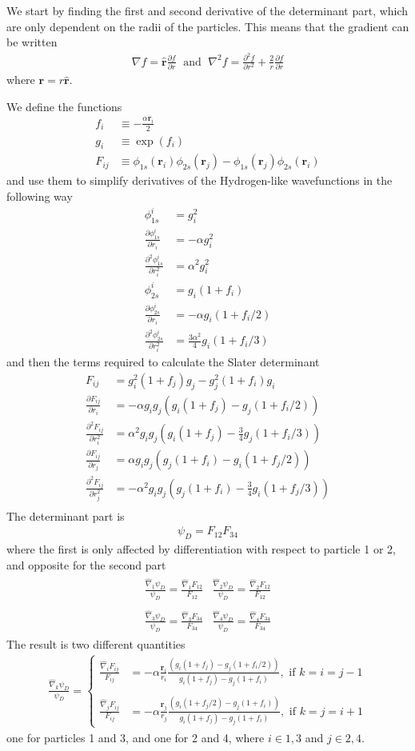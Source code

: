 \documentclass[twocolumn,8pt]{extarticle}
\newcommand{\eq}[1]{{\tiny\begin{align*}#1\end{align*}}}
\newcommand{\mat}[1]{\begin{matrix}#1\end{matrix}}
\renewcommand\vec[1]{\mathbf{#1}}
\newcommand{\op}[1]{\hat{#1}}
\newcommand{\unit}[1]{\mathbf{\hat{#1}}}
\begin{document}
We start by finding the first and second derivative of the determinant part,
which are only dependent on the radii of the particles. This means that the gradient can be written 
\eq{
  \nabla f = \unit r \frac{\partial f}{\partial r}
  \;\text{ and }\;
  \nabla^2 f = \frac{\partial^2 f}{\partial r^2} 
    + \frac{2}{r}\frac{\partial f}{\partial r}
}
where $\vec r = r\unit r$.
  
We define the functions
\eq{
  f_i &\equiv -\frac{\alpha \vec r_i}{2}\\
  g_i &\equiv \exp(f_i)\\
  F_{ij} &\equiv \phi_{1s}(\vec r_i)\phi_{2s}(\vec r_j)
  -\phi_{1s}(\vec r_j)\phi_{2s}(\vec r_i)
}
and use them to simplify derivatives 
of the Hydrogen-like wavefunctions in the following way
\eq{
  \phi_{1s}^i &= g_i^2\\
  \frac{\partial \phi_{1s}^i}{\partial r_i} &= -\alpha g_i^2\\
  \frac{\partial^2 \phi_{1s}^i}{\partial r_i^2} &= \alpha^2 g_i^2\\
  \phi_{2s}^i &= g_i(1+f_i)\\
  \frac{\partial \phi_{2s}^i}{\partial r_i} &= -\alpha g_i(1+f_i/2)\\
  \frac{\partial^2 \phi_{2s}^i}{\partial r_i^2} &= \frac{3\alpha^2}{4} g_i(1+f_i/3)
}
and then the terms required to calculate the Slater determinant
\eq{
  F_{ij} &= g_i^2 (1+f_j)g_j - g_j^2 (1+f_i)g_i\\
  \frac{\partial F_{ij}}{\partial r_i} 
    &= -\alpha g_i g_j (g_i(1+f_j) - g_j (1+f_i/2))\\
  \frac{\partial^2 F_{ij}}{\partial r_i^2} 
    &= \alpha^2 g_i g_j (g_i(1+f_j) - \frac{3}{4} g_j (1+f_i/3))\\
  \frac{\partial F_{ij}}{\partial r_j} 
    &= \alpha g_i g_j (g_j(1+f_i) - g_i (1+f_j/2))\\
  \frac{\partial^2 F_{ij}}{\partial r_j^2} 
    &= -\alpha^2 g_i g_j (g_j(1+f_i) - \frac{3}{4} g_i (1+f_j/3))\\
}
The determinant part is
\eq{
  \psi_D = F_{12}F_{34}
}
where the first is only affected by differentiation with respect to particle 1 or 2,
and opposite for the second part
\eq{
  \mat{
    \frac{\op\nabla_1 \psi_D}{\psi_D} = \frac{\op\nabla_1 F_{12}}{F_{12}} &
    \frac{\op\nabla_2 \psi_D}{\psi_D} = \frac{\op\nabla_2 F_{12}}{F_{12}} \\\\
    \frac{\op\nabla_3 \psi_D}{\psi_D} = \frac{\op\nabla_3 F_{34}}{F_{34}} &
    \frac{\op\nabla_4 \psi_D}{\psi_D} = \frac{\op\nabla_4 F_{34}}{F_{34}}
  }
}
The result is two different quantities
\eq{
  \frac{\op\nabla_k \psi_D}{\psi_D} =
  \begin{cases}
    \frac{\op\nabla_i F_{ij}}{F_{ij}}
    &= -\alpha \frac{\vec r_i}{r_i} \frac{(g_i(1+f_j) 
      - g_j (1+f_i/2))}{g_i (1+f_j) - g_j (1+f_i)}
    ,\text{ if } k=i=j-1 \\\\
    \frac{\op\nabla_j F_{ij}}{F_{ij}}
    &= -\alpha \frac{\vec r_j}{r_j}\frac{(g_i (1+f_j/2) 
      - g_j(1+f_i))}{g_i (1+f_j) - g_j (1+f_i)}
    ,\text{ if } k=j=i+1
  \end{cases}
}
one for particles 1 and 3, and one for 2 and 4, where $i\in {1,3}$ and $j\in {2,4}$.
\end{document}
